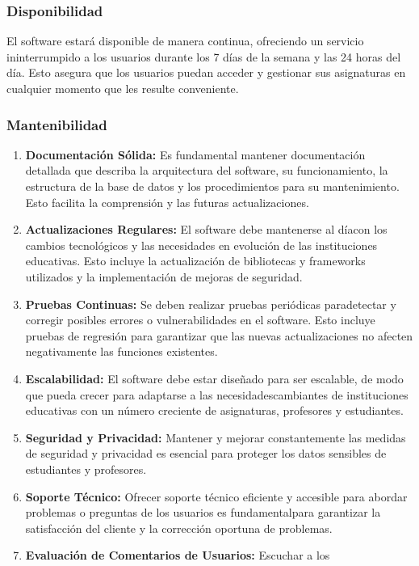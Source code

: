 \documentclass[11pt]{article}
\begin{document}
\subsubsection{Disponibilidad}

El software estará disponible de manera continua, ofreciendo un
servicio ininterrumpido a los usuarios durante los 7 días de la 
semana y las 24 horas del día. Esto asegura que los usuarios puedan
acceder y gestionar sus asignaturas en cualquier momento que les
resulte conveniente.
\subsubsection{Mantenibilidad}

\begin{enumerate}
\item \textbf{Documentación Sólida:} Es fundamental mantener 
documentación detallada que describa la arquitectura del software, 
su funcionamiento, la estructura de la base de datos y los 
procedimientos para su mantenimiento. Esto facilita la comprensión y 
las futuras actualizaciones.
\item \textbf{Actualizaciones Regulares:} El software debe 
mantenerse al díacon los cambios tecnológicos y las necesidades en 
evolución de las instituciones educativas. Esto incluye la 
actualización de bibliotecas y frameworks utilizados y la 
implementación de mejoras
de seguridad.
\item \textbf{Pruebas Continuas:} Se deben realizar pruebas 
periódicas paradetectar y corregir posibles errores o 
vulnerabilidades en el software. Esto incluye pruebas de regresión
para garantizar que las nuevas actualizaciones no afecten 
negativamente las funciones existentes.
\item \textbf{Escalabilidad:} El software debe estar diseñado para
ser escalable, de modo que pueda crecer para adaptarse a las 
necesidadescambiantes de instituciones educativas con un número 
creciente de asignaturas, profesores y estudiantes.
\item \textbf{Seguridad y Privacidad:} Mantener y mejorar 
constantemente las medidas de seguridad y privacidad es esencial 
para proteger los datos sensibles de estudiantes y profesores.
\item \textbf{Soporte Técnico:} Ofrecer soporte técnico eficiente y
accesible para abordar problemas o preguntas de los usuarios es
fundamentalpara garantizar la satisfacción del cliente y la 
corrección oportuna de problemas.
\item \textbf{Evaluación de Comentarios de Usuarios:} Escuchar a los

\end{enumerate}
\end{document}
